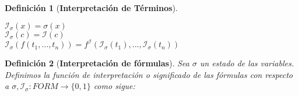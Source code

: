 \documentclass[letterpaper,11pt]{article}
\newtheorem{teo}{Definición}[]
\begin{document}
\begin{enumerate}
\begin{itemize}
\begin{teo}[\textbf{Interpretación de Términos}]
                \begin{center}
                    $\mathcal{I_{\sigma}}(x) = \sigma(x)$ \\
                    $\mathcal{I_{\sigma}}(c) = \mathcal{I}(c)$ \\
                    $\mathcal{I_{\sigma}}(f(t_{1},...,t_{n})) =
                    f^{\mathcal{I}}(\mathcal{I_{\sigma}}(t_{1}),...,
                    \mathcal{I_{\sigma}}(t_{n}))$                
                \end{center}
            \end{teo}

            \begin{teo}[\textbf{Interpretación de fórmulas}]
                Sea $\sigma$ un estado de las variables. Definimos la
                función de interpretación o significado de las fórmulas con 
                respecto a $\sigma, \mathcal{I_{\sigma}}: FORM \rightarrow
                \{ 0,1 \}$ como sigue:
                

\end{teo}
\end{itemize}
\end{enumerate}
\end{document}
